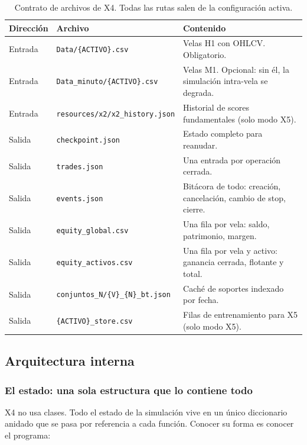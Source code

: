 \documentclass[11pt,a4paper]{article}
\newcommand{\code}[1]{\texttt{\small #1}}
\begin{document}
\begin{table}[h]
\centering
\small
\begin{tabularx}{\linewidth}{@{}l l X@{}}
\toprule
\textbf{Dirección} & \textbf{Archivo} & \textbf{Contenido} \\
\midrule
Entrada & \code{Data/\{ACTIVO\}.csv} & Velas H1 con OHLCV. Obligatorio. \\
Entrada & \code{Data_minuto/\{ACTIVO\}.csv} & Velas M1. Opcional: sin él, la simulación intra-vela se degrada. \\
Entrada & \code{resources/x2/x2_history.json} & Historial de scores fundamentales (solo modo X5). \\
Salida & \code{checkpoint.json} & Estado completo para reanudar. \\
Salida & \code{trades.json} & Una entrada por operación cerrada. \\
Salida & \code{events.json} & Bitácora de todo: creación, cancelación, cambio de stop, cierre. \\
Salida & \code{equity_global.csv} & Una fila por vela: saldo, patrimonio, margen. \\
Salida & \code{equity_activos.csv} & Una fila por vela y activo: ganancia cerrada, flotante y total. \\
Salida & \code{conjuntos_N/\{V\}_\{N\}_bt.json} & Caché de soportes indexado por fecha. \\
Salida & \code{\{ACTIVO\}_store.csv} & Filas de entrenamiento para X5 (solo modo X5). \\
\bottomrule
\end{tabularx}
\caption{Contrato de archivos de X4. Todas las rutas salen de la configuración activa.}
\end{table}

\subsection{Arquitectura interna}

\subsubsection{El estado: una sola estructura que lo contiene todo}
\label{sec:x4-estado}

X4 no usa clases. Todo el estado de la simulación vive en un único diccionario anidado que
se pasa por referencia a cada función. Conocer su forma es conocer el programa:
\end{document}
